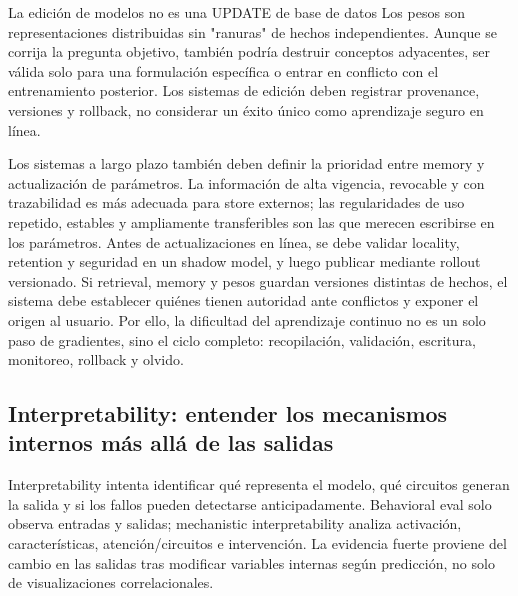 
\begin{warningbox}{La edición de modelos no es una UPDATE de base de datos}
Los pesos son representaciones distribuidas sin "ranuras" de hechos independientes. Aunque se corrija la pregunta objetivo, también podría destruir conceptos adyacentes, ser válida solo para una formulación específica o entrar en conflicto con el entrenamiento posterior. Los sistemas de edición deben registrar provenance, versiones y rollback, no considerar un éxito único como aprendizaje seguro en línea.
\end{warningbox}

Los sistemas a largo plazo también deben definir la prioridad entre memory y actualización de parámetros. La información de alta vigencia, revocable y con trazabilidad es más adecuada para store externos; las regularidades de uso repetido, estables y ampliamente transferibles son las que merecen escribirse en los parámetros. Antes de actualizaciones en línea, se debe validar locality, retention y seguridad en un shadow model, y luego publicar mediante rollout versionado. Si retrieval, memory y pesos guardan versiones distintas de hechos, el sistema debe establecer quiénes tienen autoridad ante conflictos y exponer el origen al usuario. Por ello, la dificultad del aprendizaje continuo no es un solo paso de gradientes, sino el ciclo completo: recopilación, validación, escritura, monitoreo, rollback y olvido.

\subsection{Interpretability: entender los mecanismos internos más allá de las salidas}

Interpretability intenta identificar qué representa el modelo, qué circuitos generan la salida y si los fallos pueden detectarse anticipadamente. Behavioral eval solo observa entradas y salidas; mechanistic interpretability analiza activación, características, atención/circuitos e intervención. La evidencia fuerte proviene del cambio en las salidas tras modificar variables internas según predicción, no solo de visualizaciones correlacionales.



